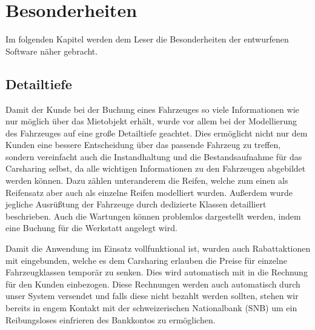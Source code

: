 \chapter{Besonderheiten}
Im folgenden Kapitel werden dem Leser die Besonderheiten der entwurfenen Software näher gebracht.

\section{Detailtiefe}
Damit der Kunde bei der Buchung eines Fahrzeuges so viele Informationen wie nur möglich über das Mietobjekt erhält, wurde vor allem bei der Modellierung des Fahrzeuges auf eine große Detailtiefe geachtet. Dies ermöglicht nicht nur dem Kunden eine bessere Entscheidung über das passende Fahrzeug zu treffen, sondern vereinfacht auch die Instandhaltung und die Bestandsaufnahme für das Carsharing selbst, da alle wichtigen Informationen zu den Fahrzeugen abgebildet werden können. Dazu zählen unteranderem die Reifen, welche zum einen als Reifensatz aber auch als einzelne Reifen modelliert wurden. Außerdem wurde jegliche Ausrüßtung der Fahrzeuge durch dedizierte Klassen detailliert beschrieben. Auch die Wartungen können problemlos dargestellt werden, indem eine Buchung für die Werkstatt angelegt wird.

Damit die Anwendung im Einsatz vollfunktional ist, wurden auch Rabattaktionen mit eingebunden, welche es dem Carsharing erlauben die Preise für einzelne Fahrzeugklassen temporär zu senken. Dies wird automatisch mit in die Rechnung für den Kunden einbezogen. Diese Rechnungen werden auch automatisch durch unser System versendet und falls diese nicht bezahlt werden sollten, stehen wir bereits in engem Kontakt mit der schweizerischen Nationalbank (SNB) um ein Reibungsloses einfrieren des Bankkontos zu ermöglichen.



